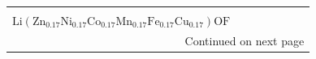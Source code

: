 \begin{table}
{\begin{tabular}{lcccccr}
{$(\mathrm{Zn}_{0.14}\mathrm{Ni}_{0.14}\mathrm{Co}_{0.14}\mathrm{Mn}_{0.14}\mathrm{Fe}_{0.14}\mathrm{Cu}_{0.14}\mathrm{Mg}_{0.14})\mathrm{O}$\\
$\mathrm{Li}(\mathrm{Zn}_{0.17}\mathrm{Ni}_{0.17}\mathrm{Co}_{0.17}\mathrm{Mn}_{0.17}\mathrm{Fe}_{0.17}\mathrm{Cu}_{0.17})\mathrm{OF}$} & ~\cite{Lin_MechanochemicalSynthesis_JournalofMaterialsScience_2020,Wang_HighEntropyLayered_CrystalGrowthDesign_2022} \\
\bottomrule
\multicolumn{7}{r}{Continued on next page}\\
\end{tabular}
}
\label{tab:candidate_table_1}
\end{table}


